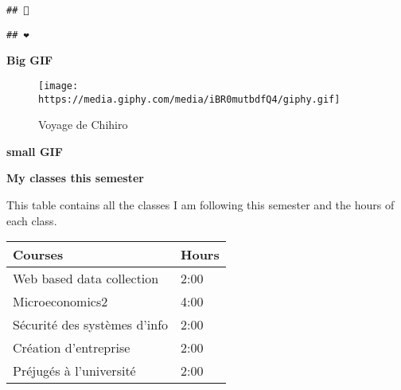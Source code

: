 \documentclass[]{article}
\begin{document}
\begin{verbatim}
## 💎
\end{verbatim}

\begin{verbatim}
## ❤️
\end{verbatim}

\textbf{Big GIF}

\begin{figure}
\centering
\texttt{[image: https://media.giphy.com/media/iBR0mutbdfQ4/giphy.gif]}
\caption{Voyage de Chihiro}
\end{figure}

\textbf{small GIF}

\textbf{My classes this semester}

This table contains all the classes I am following this semester and the
hours of each class.

\begin{longtable}[]{@{}ll@{}}
\toprule
\begin{minipage}[b]{0.22\columnwidth}\raggedright\strut
Courses\strut
\end{minipage} & \begin{minipage}[b]{0.22\columnwidth}\raggedright\strut
Hours\strut
\end{minipage}\tabularnewline
\midrule
\endhead
\begin{minipage}[t]{0.22\columnwidth}\raggedright\strut
Web based data collection\strut
\end{minipage} & \begin{minipage}[t]{0.22\columnwidth}\raggedright\strut
2:00\strut
\end{minipage}\tabularnewline
\begin{minipage}[t]{0.22\columnwidth}\raggedright\strut
Microeconomics2\strut
\end{minipage} & \begin{minipage}[t]{0.22\columnwidth}\raggedright\strut
4:00\strut
\end{minipage}\tabularnewline
\begin{minipage}[t]{0.22\columnwidth}\raggedright\strut
Sécurité des systèmes d'info\strut
\end{minipage} & \begin{minipage}[t]{0.22\columnwidth}\raggedright\strut
2:00\strut
\end{minipage}\tabularnewline
\begin{minipage}[t]{0.22\columnwidth}\raggedright\strut
Création d'entreprise\strut
\end{minipage} & \begin{minipage}[t]{0.22\columnwidth}\raggedright\strut
2:00\strut
\end{minipage}\tabularnewline
\begin{minipage}[t]{0.22\columnwidth}\raggedright\strut
Préjugés à l'université\strut
\end{minipage} & \begin{minipage}[t]{0.22\columnwidth}\raggedright\strut
2:00\strut
\end{minipage}\tabularnewline
\bottomrule
\end{longtable}
\end{document}
